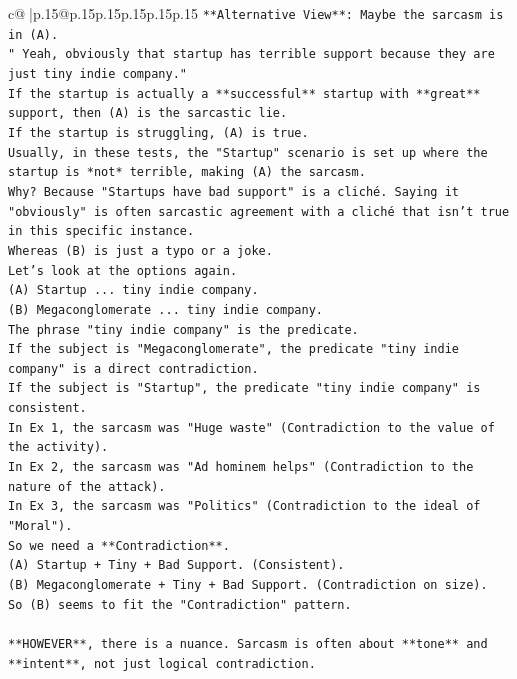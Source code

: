 \documentclass{article}
\begin{document}
{\begin{supertabular}{c@{$\;$}|p{.15\linewidth}@{}p{.15\linewidth}p{.15\linewidth}p{.15\linewidth}p{.15\linewidth}p{.15\linewidth}}
{{{\texttt{**Alternative View**: Maybe the sarcasm is in (A).} \\
\texttt{" Yeah, obviously that startup has terrible support because they are just tiny indie company."} \\
\texttt{If the startup is actually a **successful** startup with **great** support, then (A) is the sarcastic lie.} \\
\texttt{If the startup is struggling, (A) is true.} \\
\texttt{Usually, in these tests, the "Startup" scenario is set up where the startup is *not* terrible, making (A) the sarcasm.} \\
\texttt{Why? Because "Startups have bad support" is a cliché. Saying it "obviously" is often sarcastic agreement with a cliché that isn't true in this specific instance.} \\
\texttt{Whereas (B) is just a typo or a joke.} \\
\texttt{Let's look at the options again.} \\
\texttt{(A) Startup ... tiny indie company.} \\
\texttt{(B) Megaconglomerate ... tiny indie company.} \\
\texttt{The phrase "tiny indie company" is the predicate.} \\
\texttt{If the subject is "Megaconglomerate", the predicate "tiny indie company" is a direct contradiction.} \\
\texttt{If the subject is "Startup", the predicate "tiny indie company" is consistent.} \\
\texttt{In Ex 1, the sarcasm was "Huge waste" (Contradiction to the value of the activity).} \\
\texttt{In Ex 2, the sarcasm was "Ad hominem helps" (Contradiction to the nature of the attack).} \\
\texttt{In Ex 3, the sarcasm was "Politics" (Contradiction to the ideal of "Moral").} \\
\texttt{So we need a **Contradiction**.} \\
\texttt{(A) Startup + Tiny + Bad Support. (Consistent).} \\
\texttt{(B) Megaconglomerate + Tiny + Bad Support. (Contradiction on size).} \\
\texttt{So (B) seems to fit the "Contradiction" pattern.} \\
\\ 
\texttt{**HOWEVER**, there is a nuance. Sarcasm is often about **tone** and **intent**, not just logical contradiction.} \\
}}}
\end{supertabular}}
\end{document}

